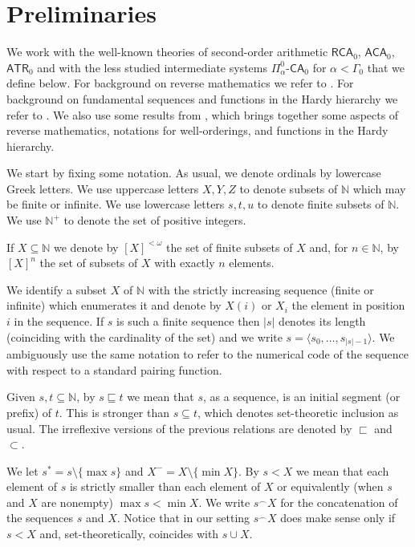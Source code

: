 \documentclass[11pt]{amsart}
\theoremstyle{definition}
\theoremstyle{remark}
\theoremstyle{plain}
\newcommand{\numberset}{\mathbb}
\newcommand{\N}{\numberset{N}}
\def\a{\alpha}
\def\G{\Gamma}
\def\conc{{}^\smallfrown}
\newcommand{\RCA}{\mathsf{RCA}_0}
\newcommand{\ACA}{\mathsf{ACA}_0}
\newcommand{\ATR}{\mathsf{ATR}_0}
\newcommand{\CA}{\mathsf{\text{-}CA}_0}
\def\N{{\mathbb{N}}}
\begin{document}
%
%
%
%


\section{Preliminaries}\label{sec:preliminaries}


%
%
%
%


We work with the well-known theories of second-order arithmetic $\RCA$, $\ACA$, $\ATR$ and with the less studied intermediate systems $\Pi^0_\a \CA$ for $\a < \G_0$ that we define below.
For background on reverse mathematics we refer to \cite{simpson, dzhafarovmummert}.
For background on fundamental sequences and functions in the Hardy hierarchy we refer to \cite{pohlers, fairtlough}. 
We also use some results from \cite{marconemontalban}, which brings together some aspects of reverse mathematics, notations for well-orderings, and functions in the Hardy hierarchy.

We start by fixing some notation.
As usual, we denote ordinals by lowercase Greek letters.
We use uppercase letters $X, Y, Z$ to denote subsets of $\N$ which may be finite or infinite.
We use lowercase letters $s, t, u$ to denote finite subsets of $\N$. 
We use $\N^+$ to denote the set of positive integers. 

If $X \subseteq \N$ we denote by $[X]^{< \omega}$ the set of finite subsets of $X$ and, for $n \in \N$, by $[X]^n$ the set of subsets of $X$ with exactly $n$ elements.

We identify a subset $X$ of $\N$ with the strictly increasing sequence (finite or infinite) which enumerates it and denote by $X(i)$ or $X_i$ the element in position $i$ in the sequence.
If $s$ is such a finite sequence then $|s|$ denotes its length (coinciding with the cardinality of the set) and we write $s = \langle s_0, \ldots, s_{|s|-1} \rangle$. 
We ambiguously use the same notation to refer to the numerical code of the sequence with respect to a standard pairing function.

Given $s,t \subseteq \N$, by $s \sqsubseteq t$ we mean that $s$, as a sequence, is an initial segment (or prefix) of $t$.
This is stronger than $s \subseteq t$, which denotes set-theoretic inclusion as usual.
The irreflexive versions of the previous relations are denoted by $\sqsubset$ and $\subset$.

We let $s^* = s \setminus \{\max s\}$ and $X^- = X \setminus \{\min X\}$.
By $s < X$ we mean that each element of $s$ is strictly smaller than each element of $X$ or equivalently (when $s$ and $X$ are nonempty) $\max s < \min X$.
We write $s \conc X$ for the concatenation of the sequences $s$ and $X$.
Notice that in our setting $s \conc X$ does make sense only if $s < X$ and, set-theoretically, coincides with $s \cup X$.
\end{document}
